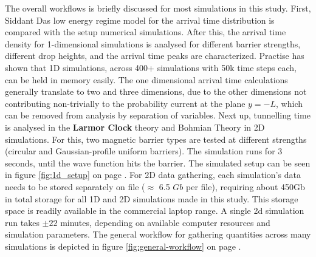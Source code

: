 The overall workflows is briefly discussed for most simulations in this study. First, Siddant Das \cite{siddhant:paper} low energy regime model for the arrival time distribution is compared with the setup numerical simulations. After this, the arrival time density for 1-dimensional simulations is analysed for different barrier strengths, different drop heights, and the arrival time peaks are characterized. Practise has shown that 1D simulations, across 400+ simulations with 50k time steps each, can be held in memory easily. The one dimensional arrival time calculations generally translate to two and three dimensions, due to the other dimensions not contributing non-trivially to the probability current at the plane $y=-L$, which can be removed from analysis by separation of variables. Next up, tunnelling time is analysed in the \textbf{Larmor Clock} theory and Bohmian Theory in 2D simulations. For this, two magnetic barrier types are tested at different strengths (circular and Gaussian-profile uniform barriers). The simulation runs for 3 seconds, until the wave function hits the barrier. The simulated setup can be seen in figure \ref{fig:1d_setup} on page \pageref{fig:1d_setup}. For 2D data gathering, each simulation's data needs to be stored separately on file ($\approx$ 6.5 $Gb$ per file), requiring about 450Gb in total storage for all 1D and 2D simulations made in this study. This storage space is readily available in the commercial laptop range. A single 2d simulation run takes $\pm22$ minutes, depending on available computer resources and simulation parameters. The general workflow for gathering quantities across many simulations is depicted in figure \ref{fig:general-workflow} on page \pageref{fig:general-workflow}.